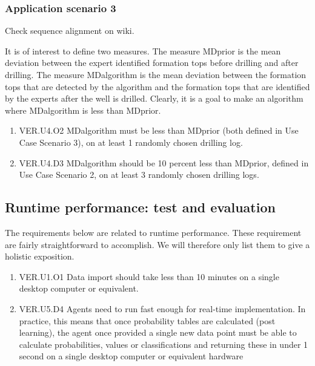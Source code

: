 \documentclass{article}
\theoremstyle{theorem}
\theoremstyle{definition}
\begin{document}
\subsubsection{Application scenario 3}

Check sequence alignment on wiki.

It is of interest to define two measures. The measure MDprior is the mean deviation between the expert identified formation tops before drilling and after drilling. The measure MDalgorithm is the mean deviation between the formation tops that are detected by the algorithm and the formation tops that are identified by the experts after the well is drilled. Clearly, it is a goal to make an algorithm where MDalgorithm is less than MDprior. 

\begin{enumerate}
\item VER.U4.O2 MDalgorithm must be less than MDprior (both defined in Use Case Scenario 3), on at least 1 randomly chosen drilling log. 
\item VER.U4.D3 MDalgorithm should be 10 percent less than MDprior, defined in Use Case Scenario 2, on at least 3 randomly chosen drilling logs. 
\end{enumerate}




\subsection{Runtime performance: test and evaluation}

The requirements below are related to runtime performance.  These requirement are fairly straightforward to accomplish.  We will therefore only list them to give a holistic exposition.

\begin{enumerate}
\item VER.U1.O1 Data import should take less than 10 minutes  on a single desktop computer or equivalent.
\item VER.U5.D4 Agents need to run fast enough for real-time implementation. In practice, this means that once probability tables are calculated  (post learning), the agent once provided a single new data point must be able to calculate probabilities, values or classifications and returning these in under 1 second on a single desktop computer or equivalent hardware
\end{enumerate}
\end{document}
